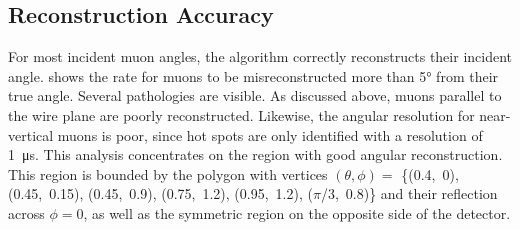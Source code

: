 \documentclass[herrin-thesis.tex]{subfiles}
\begin{document}
\subsection{Reconstruction Accuracy}
For most incident muon angles, the algorithm correctly reconstructs their incident angle.  shows the rate for muons to be misreconstructed more than \ang{5} from their true angle. Several pathologies are visible. As discussed above, muons parallel to the wire plane are poorly reconstructed. Likewise, the angular resolution for near-vertical muons is poor, since hot spots are only identified with a resolution of \SI{1}{\micro\s}. This analysis concentrates on the region with good angular reconstruction. This region is bounded by the polygon with vertices \((\theta,\phi) =\) \{(0.4,~0), (0.45,~0.15), (0.45,~0.9), (0.75,~1.2), (0.95,~1.2), (\(\pi\)/3,~0.8)\} and their reflection  across \(\phi=0\), as well as the symmetric region on the opposite side of the detector.
\end{document}
